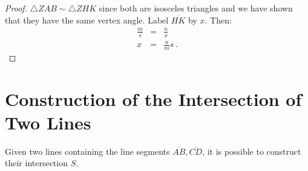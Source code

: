 \begin{proof}
$\triangle ZAB\sim\triangle ZHK$ since both are isosceles triangles and we have shown that they have the same vertex angle. Label $\overline{HK}$ by $x$. Then:
\begin{eqnarray*}
\frac{m}{s} &=& \frac{n}{x}\\
x&=&\frac{n}{m}s\,.
\end{eqnarray*}

\end{proof}



\section{Construction of the Intersection of Two Lines}\label{s.two-lines}

\begin{theorem}
Given two lines containing the line segments $\overline{AB}, \overline{CD}$, it is possible to construct their intersection $S$.
\end{theorem}

